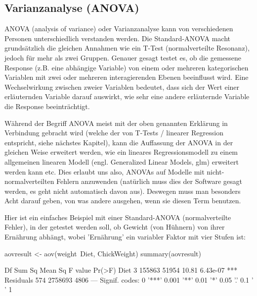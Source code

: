 \documentclass[a4paper,twoside]{tufte-book}\usepackage[]{graphicx}\usepackage[]{color}
\begin{document}
\subsection{Varianzanalyse (ANOVA)}

ANOVA (analysis of variance) oder Varianzanalyse kann von verschiedenen Personen unterschiedlich verstanden werden. Die Standard-ANOVA macht grundsätzlich die gleichen Annahmen wie ein T-Test (normalverteilte Resonanz), jedoch für mehr als zwei Gruppen. Genauer gesagt testet es, ob die gemessene Response (z.B. eine abhängige Variable) von einem oder mehreren kategorischen Variablen mit zwei oder mehreren interagierenden Ebenen beeinflusst wird. Eine Wechselwirkung zwischen zweier Variablen bedeutet, dass sich der Wert einer erläuternden Variable darauf auswirkt, wie sehr eine andere erläuternde Variable die Response beeinträchtigt.

Während der Begriff ANOVA meist mit der oben genannten Erklärung in Verbindung gebracht wird (welche der von T-Tests / linearer Regression entspricht, siehe nächstes Kapitel), kann die Auffassung der ANOVA in der gleichen Weise erweitert werden, wie ein lineares Regressionsmodell zu einem allgemeinen linearen Modell (engl. Generalized Linear Models, glm) erweitert werden kann etc. Dies erlaubt uns also, ANOVAs auf Modelle mit nicht-normalverteilten Fehlern anzuwenden (natürlich muss dies der Software gesagt werden, es geht nicht automatisch davon aus). Deswegen muss man besonders Acht darauf geben, von was andere ausgehen, wenn sie diesen Term benutzen.

Hier ist ein einfaches Beispiel mit einer Standard-ANOVA (normalverteilte Fehler), in der getestet werden soll, ob Gewicht (von Hühnern) von ihrer Ernährung abhängt, wobei 'Ernährung' ein variabler Faktor mit vier Stufen ist:

\begin{Schunk}
\begin{Sinput}
aovresult <- aov(weight~Diet, ChickWeight)
summary(aovresult)
\end{Sinput}
\begin{Soutput}
             Df  Sum Sq Mean Sq F value   Pr(>F)    
Diet          3  155863   51954   10.81 6.43e-07 ***
Residuals   574 2758693    4806                     
---
Signif. codes:  0 '***' 0.001 '**' 0.01 '*' 0.05 '.' 0.1 ' ' 1
\end{Soutput}
\end{Schunk}
\end{document}
